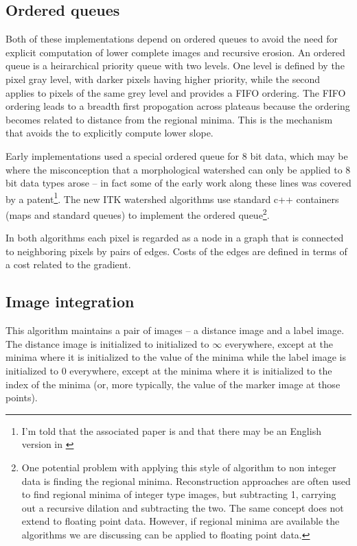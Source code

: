 \documentclass{InsightArticle}
\begin{document}
\subsection{Ordered queues}
Both of these implementations depend on ordered queues to avoid the
need for explicit computation of lower complete images and recursive
erosion. An ordered queue is a heirarchical priority queue with two
levels. One level is defined by the pixel gray level, with darker
pixels having higher priority, while the second applies to pixels of
the same grey level and provides a FIFO ordering. The FIFO ordering
leads to a breadth first propogation across plateaus because the
ordering becomes related to distance from the regional minima. This is
the mechanism that avoids the to explicitly compute lower slope.

Early implementations used a special ordered queue for 8 bit data,
which may be where the misconception that a morphological watershed
can only be applied to 8 bit data types arose -- in fact some of the
early work along these lines was covered by a patent\footnote{I'm told
that the associated paper is \cite{Meyer91a} and that there may be an
English version in \cite{Dougherty93a}}. The new ITK watershed
algorithms use standard c++ containers (maps and standard queues) to
implement the ordered queue\footnote{One potential problem with
applying this style of algorithm to non integer data is finding the
regional minima. Reconstruction approaches are often used to find
regional minima of integer type images, but subtracting 1, carrying
out a recursive dilation and subtracting the two. The same concept
does not extend to floating point data. However, if regional minima
are available the algorithms we are discussing can be applied to
floating point data.}.

In both algorithms each pixel is regarded as a node in a graph that is
connected to neighboring pixels by pairs of edges. Costs of the edges
are defined in terms of a cost related to the gradient.

\subsection{Image integration}
This algorithm maintains a pair of images -- a distance image and a
label image. The distance image is initialized to initialized to
$\infty$ everywhere, except at the minima where it is initialized to
the value of the minima while the label image is initialized to $0$
everywhere, except at the minima where it is initialized to the index
of the minima (or, more typically, the value of the marker image at
those points).
\end{document}
